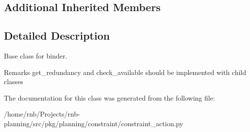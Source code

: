 \subsection*{Additional Inherited Members}


\subsection{Detailed Description}
Base class for binder. 

\begin{DoxyRemark}{Remarks}
get\+\_\+redundancy and check\+\_\+available should be implemented with child classes 
\end{DoxyRemark}


The documentation for this class was generated from the following file\+:\begin{DoxyCompactItemize}
\item 
/home/rnb/\+Projects/rnb-\/planning/src/pkg/planning/constraint/constraint\+\_\+action.\+py\end{DoxyCompactItemize}
